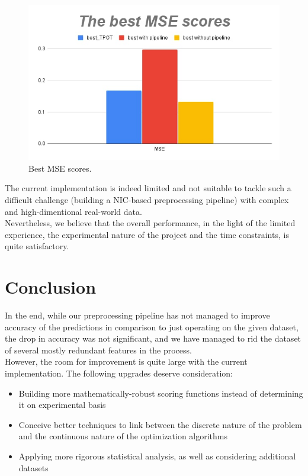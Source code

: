 \documentclass[conference]{IEEEtran}
\begin{document}
\begin{figure}[hbt!]
	\centerline{\includegraphics[scale=0.55]{picture3.jpg}}
	\caption{Best MSE scores.}
	\label{fig1}
\end{figure}

The current implementation is indeed limited and not suitable to tackle such a difficult challenge (building a NIC-based preprocessing pipeline) with complex and high-dimentional real-world data. \\

Nevertheless, we believe that the overall performance, in the light of the limited experience, the experimental nature of the project and the time constraints, is quite satisfactory.


\section{Conclusion}

In the end, while our preprocessing pipeline has not managed to improve accuracy of the predictions in comparison to just operating on the given dataset, the drop in accuracy was not significant, and we have managed to rid the dataset of several mostly redundant features in the process. \\

However, the room for improvement is quite large with the current implementation. The following upgrades deserve consideration:
\begin{itemize}
	\item Building more mathematically-robust scoring functions instead of determining it on experimental basis
	\item Conceive better techniques to link between the discrete nature of the problem and the continuous nature of the optimization algorithms
	\item Applying more rigorous statistical analysis, as well as considering additional datasets
\end{itemize}



\end{document}
